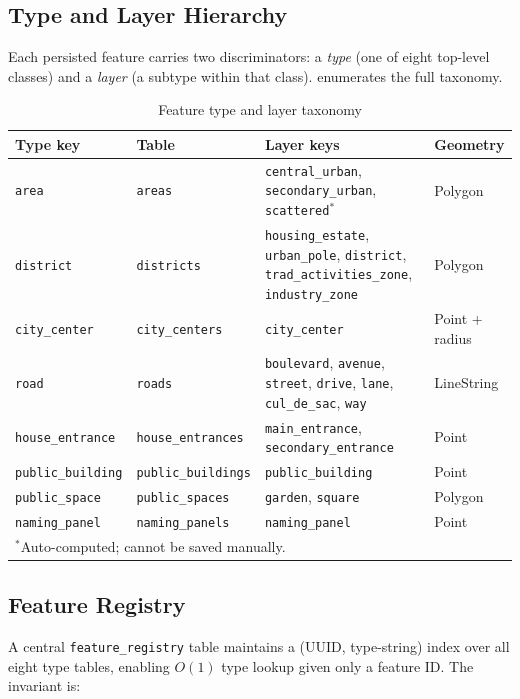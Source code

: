 \documentclass[12pt,a4paper]{article}
\theoremstyle{definition}
\theoremstyle{plain}
\theoremstyle{remark}
\begin{document}
\subsection{Type and Layer Hierarchy}

Each persisted feature carries two discriminators: a \emph{type} (one of
eight top-level classes) and a \emph{layer} (a subtype within that class).
 enumerates the full taxonomy.

\begin{table}[H]
\centering
\caption{Feature type and layer taxonomy}
\label{tab:feature_types}
\begin{tabularx}{\textwidth}{llXl}
\toprule
\textbf{Type key} & \textbf{Table} & \textbf{Layer keys} & \textbf{Geometry} \\
\midrule
\texttt{area} & \texttt{areas} &
  \texttt{central\_urban}, \texttt{secondary\_urban}, \texttt{scattered}$^*$
  & Polygon \\
\texttt{district} & \texttt{districts} &
  \texttt{housing\_estate}, \texttt{urban\_pole}, \texttt{district},
  \texttt{trad\_activities\_zone}, \texttt{industry\_zone}
  & Polygon \\
\texttt{city\_center} & \texttt{city\_centers} &
  \texttt{city\_center} & Point + radius \\
\texttt{road} & \texttt{roads} &
  \texttt{boulevard}, \texttt{avenue}, \texttt{street}, \texttt{drive},
  \texttt{lane}, \texttt{cul\_de\_sac}, \texttt{way}
  & LineString \\
\texttt{house\_entrance} & \texttt{house\_entrances} &
  \texttt{main\_entrance}, \texttt{secondary\_entrance} & Point \\
\texttt{public\_building} & \texttt{public\_buildings} &
  \texttt{public\_building} & Point \\
\texttt{public\_space} & \texttt{public\_spaces} &
  \texttt{garden}, \texttt{square} & Polygon \\
\texttt{naming\_panel} & \texttt{naming\_panels} &
  \texttt{naming\_panel} & Point \\
\bottomrule
\multicolumn{4}{l}{$^*$Auto-computed; cannot be saved manually.}
\end{tabularx}
\end{table}

\subsection{Feature Registry}

A central \texttt{feature\_registry} table maintains a
(UUID, type-string) index over all eight type tables, enabling
$O(1)$ type lookup given only a feature ID. The invariant is:
\end{document}
